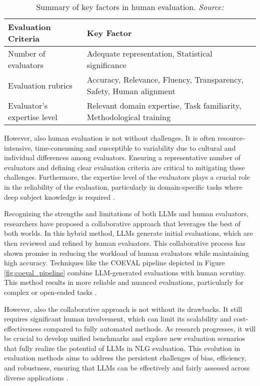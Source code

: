\begin{table}[h!]
\centering
\begin{tabular}{|p{4cm}|p{8cm}|}
\hline
\textbf{Evaluation Criteria} & \textbf{Key Factor} \\ \hline
Number of evaluators & Adequate representation, Statistical significance \\ \hline
Evaluation rubrics & Accuracy, Relevance, Fluency, Transparency, \newline Safety, Human alignment \\ \hline
Evaluator’s expertise level & Relevant domain expertise, Task familiarity, \newline Methodological training \\ \hline
\end{tabular}
\caption{Summary of key factors in human evaluation. \textit{Source:} \cite{chang2024survey}}
\end{table}

However, also human evaluation is not without challenges. It is often resource-intensive, time-consuming and susceptible to variability due to cultural and individual differences among evaluators. Ensuring a representative number of evaluators and defining clear evaluation criteria are critical to mitigating these challenges. Furthermore, the expertise level of the evaluators plays a crucial role in the reliability of the evaluation, particularly in domain-specific tasks where deep subject knowledge is required \cite{chang2024survey}.

Recognizing the strengths and limitations of both LLMs and human evaluators, researchers have proposed a collaborative approach that leverages the best of both worlds. In this hybrid method, LLMs generate initial evaluations, which are then reviewed and refined by human evaluators. This collaborative process has shown promise in reducing the workload of human evaluators while maintaining high accuracy. Techniques like the COEVAL pipeline depicted in Figure \ref{fig:coeval_pipeline} combine LLM-generated evaluations with human scrutiny. This method results in more reliable and nuanced evaluations, particularly for complex or open-ended tasks \cite{li2023collaborative, zhang2021human}.

However, also the collaborative approach is not without its drawbacks. It still requires significant human involvement, which can limit its scalability and cost-effectiveness compared to fully automated methods. As research progresses, it will be crucial to develop unified benchmarks and explore new evaluation scenarios that fully realize the potential of LLMs in NLG evaluation. This evolution in evaluation methods aims to address the persistent challenges of bias, efficiency, and robustness, ensuring that LLMs can be effectively and fairly assessed across diverse applications \cite{gao2023retrieval}.

